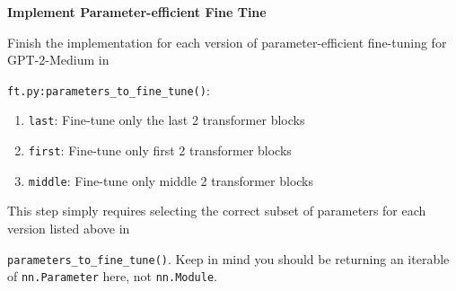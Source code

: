 \item {} {\bf Implement Parameter-efficient Fine Tine}

Finish the implementation for each version of parameter-efficient fine-tuning for GPT-2-Medium in 

\texttt{ft.py:parameters\_to\_fine\_tune()}:

\begin{enumerate}[label=(\roman*)]
    \item \texttt{last}: Fine-tune only the last 2 transformer blocks
    \item \texttt{first}: Fine-tune only first 2 transformer blocks
    \item \texttt{middle}: Fine-tune only middle 2 transformer blocks
\end{enumerate}
This step simply requires selecting the correct subset of parameters for each version listed above in 

\texttt{parameters\_to\_fine\_tune()}. Keep in mind you should be returning an iterable of \texttt{nn.Parameter} here, not \texttt{nn.Module}.